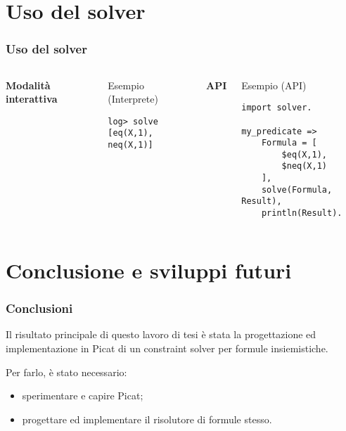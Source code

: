 \documentclass{beamer}
\begin{document}
\section{Uso del solver}

\begin{frame}[fragile]
  \frametitle{Uso del solver}
  \begin{columns}[c]
    \textbf{Modalità interattiva}
    \begin{exampleblock}{Esempio (Interprete)}
\begin{verbatim}
log> solve 
[eq(X,1), neq(X,1)]
\end{verbatim}
    \end{exampleblock}

    \textbf{API}
    \begin{exampleblock}{Esempio (API)}
\begin{verbatim}
import solver.

my_predicate =>
    Formula = [ 
        $eq(X,1), 
        $neq(X,1) 
    ],
    solve(Formula, Result),
    println(Result).
\end{verbatim}
    \end{exampleblock}
  \end{columns}
\end{frame}

\section{Conclusione e sviluppi futuri}

\begin{frame}
  \frametitle{Conclusioni} Il risultato principale di questo lavoro di
  tesi è stata la progettazione ed implementazione in Picat di un
  constraint solver per formule insiemistiche.
  
  \bigskip
  
  Per farlo, è stato necessario:
  \begin{itemize}
  \item sperimentare e capire Picat;
  \item progettare ed implementare il risolutore di formule stesso.
  \end{itemize}
\end{frame}
\end{document}
